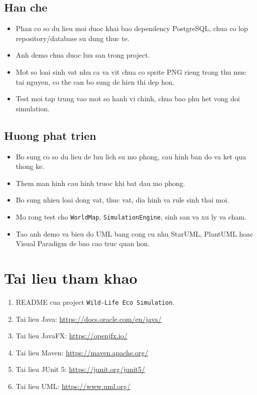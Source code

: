 \documentclass[12pt,a4paper]{article}
\begin{document}
\subsection{Han che}

\begin{itemize}
    \item Phan co so du lieu moi duoc khai bao dependency PostgreSQL, chua co lop repository/database su dung thuc te.
    \item Anh demo chua duoc luu san trong project.
    \item Mot so loai sinh vat nhu ca va vit chua co sprite PNG rieng trong thu muc tai nguyen, co the can bo sung de hien thi dep hon.
    \item Test moi tap trung vao mot so hanh vi chinh, chua bao phu het vong doi simulation.
\end{itemize}

\subsection{Huong phat trien}

\begin{itemize}
    \item Bo sung co so du lieu de luu lich su mo phong, cau hinh ban do va ket qua thong ke.
    \item Them man hinh cau hinh truoc khi bat dau mo phong.
    \item Bo sung nhieu loai dong vat, thuc vat, dia hinh va rule sinh thai moi.
    \item Mo rong test cho \texttt{WorldMap}, \texttt{SimulationEngine}, sinh san va xu ly va cham.
    \item Tao anh demo va bieu do UML bang cong cu nhu StarUML, PlantUML hoac Visual Paradigm de bao cao truc quan hon.
\end{itemize}

\section{Tai lieu tham khao}

\begin{enumerate}
    \item README cua project \texttt{Wild-Life Eco Simulation}.
    \item Tai lieu Java: \url{https://docs.oracle.com/en/java/}
    \item Tai lieu JavaFX: \url{https://openjfx.io/}
    \item Tai lieu Maven: \url{https://maven.apache.org/}
    \item Tai lieu JUnit 5: \url{https://junit.org/junit5/}
    \item Tai lieu UML: \url{https://www.uml.org/}
\end{enumerate}
\end{document}
